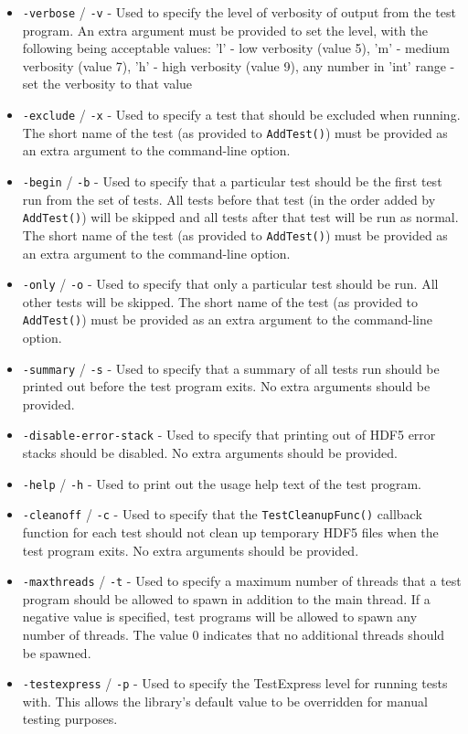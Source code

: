 \documentclass[../HDF5_RFC.tex]{subfiles}
\begin{document}
\begin{itemize}

    \item \texttt{-verbose} / \texttt{-v} - Used to specify the level of verbosity of output from the
          test program. An extra argument must be provided to set the level, with the following being
          acceptable values: 'l' - low verbosity (value 5), 'm' - medium verbosity (value 7),
          'h' - high verbosity (value 9), any number in 'int' range - set the verbosity to that value
    \item \texttt{-exclude} / \texttt{-x} - Used to specify a test that should be excluded when running.
          The short name of the test (as provided to \texttt{AddTest()}) must be provided as an extra
          argument to the command-line option.
    \item \texttt{-begin} / \texttt{-b} - Used to specify that a particular test should be the first
          test run from the set of tests. All tests before that test (in the order added by
          \texttt{AddTest()}) will be skipped and all tests after that test will be run as normal.
          The short name of the test (as provided to \texttt{AddTest()}) must be provided as an extra
          argument to the command-line option.
    \item \texttt{-only} / \texttt{-o} - Used to specify that only a particular test should be run.
          All other tests will be skipped. The short name of the test (as provided to \texttt{AddTest()})
          must be provided as an extra argument to the command-line option.
    \item \texttt{-summary} / \texttt{-s} - Used to specify that a summary of all tests run should be
          printed out before the test program exits. No extra arguments should be provided.
    \item \texttt{-disable-error-stack} - Used to specify that printing out of HDF5 error stacks should
          be disabled. No extra arguments should be provided.
    \item \texttt{-help} / \texttt{-h} - Used to print out the usage help text of the test program.
    \item \texttt{-cleanoff} / \texttt{-c} - Used to specify that the \texttt{TestCleanupFunc()} callback
          function for each test should not clean up temporary HDF5 files when the test program exits.
          No extra arguments should be provided.
    \item \texttt{-maxthreads} / \texttt{-t} - Used to specify a maximum number of threads that a test
          program should be allowed to spawn in addition to the main thread. If a negative value is
          specified, test programs will be allowed to spawn any number of threads. The value 0 indicates
          that no additional threads should be spawned.
    \item \texttt{-testexpress} / \texttt{-p} - Used to specify the TestExpress level for running tests
          with. This allows the library's default value to be overridden for manual testing purposes.

\end{itemize}
\end{document}
